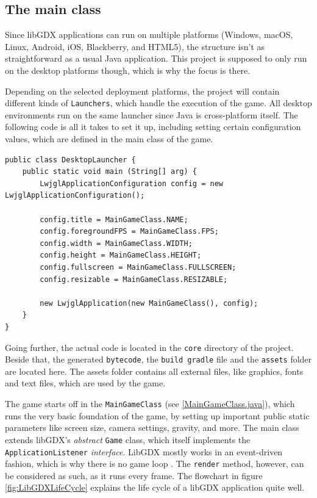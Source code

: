 \documentclass[12p]{article}
\begin{document}

\subsection{The main class} \label{DocMainClass}

Since libGDX applications can run on multiple platforms (Windows, macOS, Linux, Android, iOS, Blackberry, and HTML5), the structure isn't as straightforward as a usual Java application. This project is supposed to only run on the desktop platforms though, which is why the focus is there.

Depending on the selected deployment platforms, the project will contain different kinds of \texttt{Launchers}, which handle the execution of the game. All desktop environments run on the same launcher since Java is cross-platform itself. The following code is all it takes to set it up, including setting certain configuration values, which are defined in the main class of the game.

\begin{verbatim}
public class DesktopLauncher {
	public static void main (String[] arg) {
		LwjglApplicationConfiguration config = new LwjglApplicationConfiguration();

		config.title = MainGameClass.NAME;
		config.foregroundFPS = MainGameClass.FPS;
		config.width = MainGameClass.WIDTH;
		config.height = MainGameClass.HEIGHT;
		config.fullscreen = MainGameClass.FULLSCREEN;
		config.resizable = MainGameClass.RESIZABLE;

		new LwjglApplication(new MainGameClass(), config);
	}
}
\end{verbatim}

Going further, the actual code is located in the \texttt{core} directory of the project. Beside that, the generated \texttt{bytecode}, the \texttt{build gradle} file and the \texttt{assets} folder are located here. The assets folder contains all external files, like graphics, fonts and text files, which are used by the game.

The game starts off in the \texttt{MainGameClass} (see \ref{MainGameClass.java}), which runs the very basic foundation of the game, by setting up important public static parameters like screen size, camera settings, gravity, and more. The main class extends libGDX's \emph{abstract} \texttt{Game} class, which itself implements the \texttt{ApplicationListener} \emph{interface}. LibGDX mostly works in an event-driven fashion, which is why there is no game loop \cite{libGDXLifeCycle}. The \texttt{render} method, however, can be considered as such, as it runs every frame. The flowchart in figure \ref{fig:LibGDXLifeCycle} explains the life cycle of a libGDX application quite well.
\end{document}
